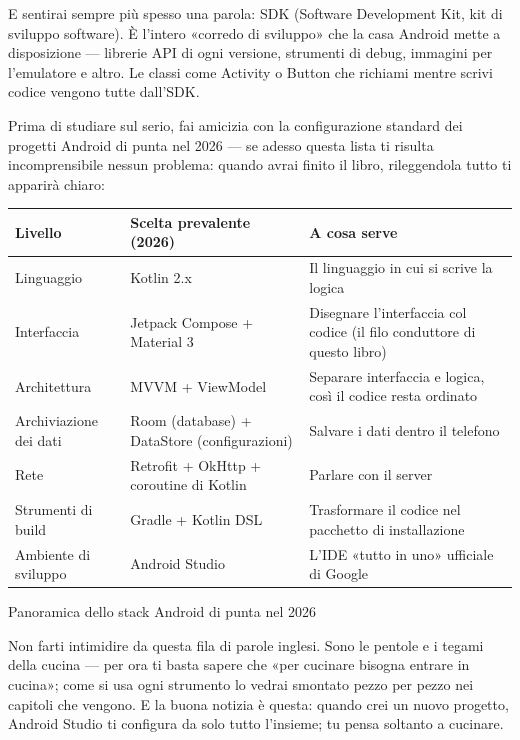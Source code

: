 E sentirai sempre più spesso una parola: SDK (Software Development Kit, kit di sviluppo software). È l'intero «corredo di sviluppo» che la casa Android mette a disposizione — librerie API di ogni versione, strumenti di debug, immagini per l'emulatore e altro. Le classi come Activity o Button che richiami mentre scrivi codice vengono tutte dall'SDK.


Prima di studiare sul serio, fai amicizia con la configurazione standard dei progetti Android di punta nel 2026 — se adesso questa lista ti risulta incomprensibile nessun problema: quando avrai finito il libro, rileggendola tutto ti apparirà chiaro:

\begin{center}
\begin{tabularx}{\linewidth}{|X|X|X|}
\hline
\textbf{Livello} & \textbf{Scelta prevalente (2026)} & \textbf{A cosa serve} \tabularnewline
\hline
Linguaggio & Kotlin 2.x & Il linguaggio in cui si scrive la logica \tabularnewline
Interfaccia & Jetpack Compose + Material 3 & Disegnare l'interfaccia col codice (il filo conduttore di questo libro) \tabularnewline
Architettura & MVVM + ViewModel & Separare interfaccia e logica, così il codice resta ordinato \tabularnewline
Archiviazione dei dati & Room (database) + DataStore (configurazioni) & Salvare i dati dentro il telefono \tabularnewline
Rete & Retrofit + OkHttp + coroutine di Kotlin & Parlare con il server \tabularnewline
Strumenti di build & Gradle + Kotlin DSL & Trasformare il codice nel pacchetto di installazione \tabularnewline
Ambiente di sviluppo & Android Studio & L'IDE «tutto in uno» ufficiale di Google \tabularnewline
\hline
\end{tabularx}
\end{center}

\begin{center}\small\color{gray}Panoramica dello stack Android di punta nel 2026\end{center}

Non farti intimidire da questa fila di parole inglesi. Sono le pentole e i tegami della cucina — per ora ti basta sapere che «per cucinare bisogna entrare in cucina»; come si usa ogni strumento lo vedrai smontato pezzo per pezzo nei capitoli che vengono. E la buona notizia è questa: quando crei un nuovo progetto, Android Studio ti configura da solo tutto l'insieme; tu pensa soltanto a cucinare.

